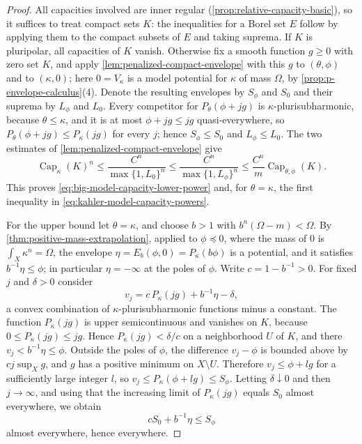 \begin{proof}
All capacities involved are inner regular (\cref{prop:relative-capacity-basic}), so it suffices to treat compact sets $K$: the inequalities for a Borel set $E$ follow by applying them to the compact subsets of $E$ and taking suprema. If $K$ is pluripolar, all capacities of $K$ vanish. Otherwise fix a smooth function $g\geq0$ with zero set $K$, and apply \cref{lem:penalized-compact-envelope} with this $g$ to $(\theta,\phi)$ and to $(\kappa,0)$; here $0=V_\kappa$ is a model potential for $\kappa$ of mass $\Omega$, by \cref{prop:p-envelope-calculus}(4). Denote the resulting envelopes by $S_\phi$ and $S_0$ and their suprema by $L_\phi$ and $L_0$. Every competitor for $P_\theta(\phi+jg)$ is $\kappa$-plurisubharmonic, because $\theta\leq\kappa$, and it is at most $\phi+jg\leq jg$ quasi-everywhere, so $P_\theta(\phi+jg)\leq P_\kappa(jg)$ for every $j$; hence $S_\phi\leq S_0$ and $L_\phi\leq L_0$. The two estimates of \cref{lem:penalized-compact-envelope} give
\[
 \operatorname{Cap}_\kappa(K)^n
    \leq\frac{C^n}{\max\{1,L_0\}^n}
    \leq\frac{C^n}{\max\{1,L_\phi\}^n}
    \leq\frac{C^n}{m}\operatorname{Cap}_{\theta,\phi}(K).
\]
This proves \eqref{eq:big-model-capacity-lower-power} and, for $\theta=\kappa$, the first inequality in \eqref{eq:kahler-model-capacity-powers}.

For the upper bound let $\theta=\kappa$, and choose $b>1$ with $b^n(\Omega-m)<\Omega$. By \cref{thm:positive-mass-extrapolation}, applied to $\phi\preceq0$, where the mass of $0$ is $\int_X\kappa^n=\Omega$, the envelope $\eta=E_b(\phi,0)=P_\kappa(b\phi)$ is a potential, and it satisfies $b^{-1}\eta\leq\phi$; in particular $\eta=-\infty$ at the poles of $\phi$. Write $c=1-b^{-1}>0$. For fixed $j$ and $\delta>0$ consider
\[
 v_j=c\,P_\kappa(jg)+b^{-1}\eta-\delta,
\]
a convex combination of $\kappa$-plurisubharmonic functions minus a constant. The function $P_\kappa(jg)$ is upper semicontinuous and vanishes on $K$, because $0\leq P_\kappa(jg)\leq jg$. Hence $P_\kappa(jg)<\delta/c$ on a neighborhood $U$ of $K$, and there $v_j<b^{-1}\eta\leq\phi$. Outside the poles of $\phi$, the difference $v_j-\phi$ is bounded above by $cj\sup_Xg$, and $g$ has a positive minimum on $X\setminus U$. Therefore $v_j\leq\phi+lg$ for a sufficiently large integer $l$, so $v_j\leq P_\kappa(\phi+lg)\leq S_\phi$. Letting $\delta\downarrow0$ and then $j\to\infty$, and using that the increasing limit of $P_\kappa(jg)$ equals $S_0$ almost everywhere, we obtain
\[
 cS_0+b^{-1}\eta\leq S_\phi
\]
almost everywhere, hence everywhere.


\end{proof}
